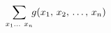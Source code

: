 \documentclass[preview]{standalone}
\begin{document}
\begin{align*}
\special{dvisvgm:raw <g id='unique000'>}\sum_{x_1\ldots\ x_n}\!\! g(x_1,\,x_2,\,\ldots,\,x_n)\special{dvisvgm:raw </g>}
\end{align*}
\end{document}
